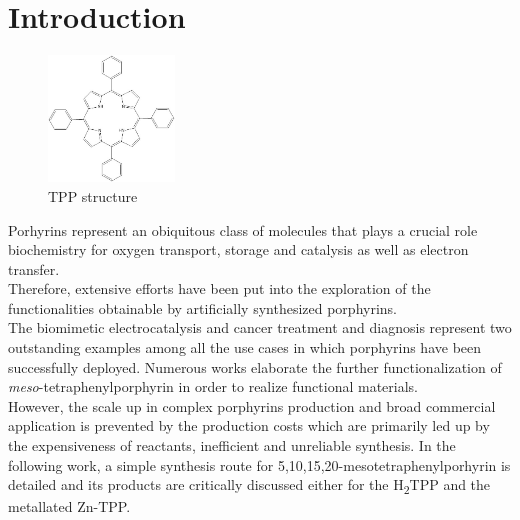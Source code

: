 \documentclass[twoside,twocolumn,9pt]{article}
\begin{document}
	\section{Introduction}
	\begin{figure}
		\includegraphics[width=0.3\textwidth]{TPP}
		\caption{TPP structure}
		\label{TPP-structure}
	\end{figure}
	Porhyrins represent an obiquitous class of molecules that plays a crucial role biochemistry for oxygen transport\citep{hardison_evolution_2012}, storage\citep{kendrew_three-dimensional_1958} and catalysis as well as electron transfer\citep{keilin_cytochrome_1925}.\\
	Therefore, extensive efforts have been put into the exploration of the functionalities obtainable by artificially synthesized porphyrins.\\
	The biomimetic electrocatalysis\cite{facchin_oxygen_2021,liang_porphyrin-based_2021} and cancer treatment and diagnosis\cite{wang_recent_2021} represent two outstanding examples among all the use cases in which porphyrins have been successfully deployed.
	Numerous works elaborate the further functionalization of \textit{meso}-tetraphenylporphyrin\cite{silva_porphyrins_2006} in order to realize functional materials. \\
	However, the scale up in complex porphyrins production and broad commercial application is prevented by the production costs which are primarily led up by the expensiveness of reactants, inefficient and unreliable synthesis.
	In the following work, a simple synthesis route for 5,10,15,20-mesotetraphenylporhyrin is detailed and its products are critically discussed either for the \texorpdfstring{H\textsubscript{2}}-TPP and the metallated Zn-TPP.
\end{document}
